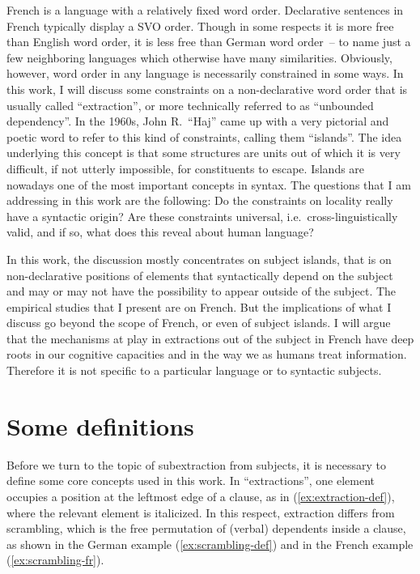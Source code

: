 French is a language with a relatively fixed word order. Declarative sentences in French typically display a SVO order. Though in some respects it is more free than English word order, it is less free than German word order~-- to name just a few neighboring languages which otherwise have many similarities. Obviously, however, word order in any language is necessarily constrained in some ways. In this work, I will discuss some constraints on a non-declarative word order that is usually called ``extraction'', or more technically referred to as ``unbounded dependency''. In the 1960s, John R.\ ``Haj'' \citeauthor{Ross.1967} came up with a very pictorial and poetic word to refer to this kind of constraints, calling them ``islands''. The idea underlying this concept is that some structures are units out of which it is very difficult, if not utterly impossible, for constituents to escape. Islands are nowadays one of the most important concepts in syntax. The questions that I am addressing in this work are the following: Do the constraints on locality really have a syntactic origin? Are these constraints universal, i.e.\ cross-linguistically valid, and if so, what does this reveal about human language?

In this work, the discussion mostly concentrates on subject islands, that is on non-declarative positions of elements that syntactically depend on the subject and may or may not have the possibility to appear outside of the subject. The empirical studies that I present are on French. But the implications of what I discuss go beyond the scope of French, or even of subject islands. I will argue that the mechanisms at play in extractions out of the subject in French have deep roots in our cognitive capacities and in the way we as humans treat information. Therefore it is not specific to a particular language or to syntactic subjects. 

\section{Some definitions}

Before we turn to the topic of subextraction from subjects, it is necessary to define some core concepts used in this work. In ``extractions'', one element occupies a position at the leftmost edge of a clause, as in (\ref{ex:extraction-def}), where the relevant element is italicized. In this respect, extraction differs from scrambling, which is the free permutation of (verbal) dependents inside a clause, as shown in the German example (\ref{ex:scrambling-def}) and in the French example (\ref{ex:scrambling-fr}).

